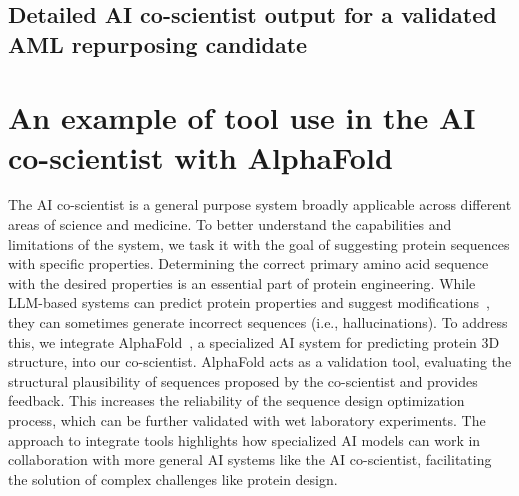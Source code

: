 \clearpage
\subsection{Detailed AI co-scientist output for a validated AML repurposing candidate}
\label{sec:drug_output}



\clearpage
\section{An example of tool use in the AI co-scientist with AlphaFold}
\label{sec:alphafold}
The AI co-scientist is a general purpose system broadly applicable across different areas of science and medicine. To better understand the capabilities and limitations of the system, we task it with the goal of suggesting protein sequences with specific properties. Determining the correct primary amino acid sequence with the desired properties is an essential part of protein engineering. While LLM-based systems can predict protein properties and suggest modifications~\citep{wang2025large}, they can sometimes generate incorrect sequences (i.e., hallucinations). To address this, we integrate AlphaFold~\citep{jumper2021highly}, a specialized AI system for predicting protein 3D structure, into our co-scientist. AlphaFold acts as a validation tool, evaluating the structural plausibility of sequences proposed by the co-scientist and provides feedback. This increases the reliability of the sequence design optimization process, which can be further validated with wet laboratory experiments. The approach to integrate tools highlights how specialized AI models can work in collaboration with more general AI systems like the AI co-scientist, facilitating the solution of complex challenges like protein design.

